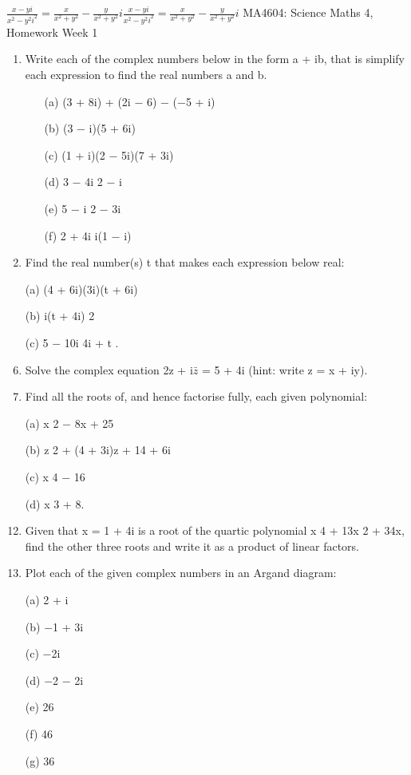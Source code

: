 \documentclass[12pt, a4paper]{report}
\theoremstyle{plain}
\theoremstyle{definition}
\theoremstyle{remark}
\begin{document}
${\displaystyle {\frac {x-yi}{x^{2}-y^{2}i^{2}}}={\frac {x}{x^{2}+y^{2}}}-{\frac {y}{x^{2}+y^{2}}}i} {\displaystyle {\frac {x-yi}{x^{2}-y^{2}i^{2}}}={\frac {x}{x^{2}+y^{2}}}-{\frac {y}{x^{2}+y^{2}}}i}$
\newpage
MA4604: Science Maths 4, Homework Week 1
\begin{enumerate}
\item Write each of the complex numbers below in the form a + ib, that is simplify each
expression to find the real numbers a and b.
\begin{multicols}{2}
\begin{itemize}
\item[(a)] (3 + 8i) + (2i − 6) − (−5 + i) \item[(b)] (3 − i)(5 + 6i) \item[(c)] (1 + i)(2 − 5i)(7 + 3i)
\item[(d)] 3 − 4i
2 − i
\item[(e)] 5 − i
2 − 3i
\item[(f)] 2 + 4i
i(1 − i)
\end{itemize}
\end{multicols}
\item Find the real number(s) t that makes each expression below real:
\item[(a)] (4 + 6i)(3i)(t + 6i) \item[(b)] i(t + 4i)
2
\item[(c)] 5 − 10i
4i + t
.
\item Solve the complex equation 2z + i$\bar{z}$ = 5 + 4i (hint: write z = x + iy).
\item Find all the roots of, and hence factorise fully, each given polynomial:
\item[(a)] x
2 − 8x + 25 \item[(b)] z
2 + (4 + 3i)z + 14 + 6i \item[(c)] x
4 − 16 \item[(d)] x
3 + 8.
\item Given that x = 1 + 4i is a root of the quartic polynomial x
4 + 13x
2 + 34x, find the other
three roots and write it as a product of linear factors.
\item Plot each of the given complex numbers in an Argand diagram:
\item[(a)] 2 + i \item[(b)] −1 + 3i \item[(c)] −2i \item[(d)] −2 − 2i
\item[(e)] 26
\item[(f)] 46
\item[(g)] 36


\end{enumerate}
\end{document}
